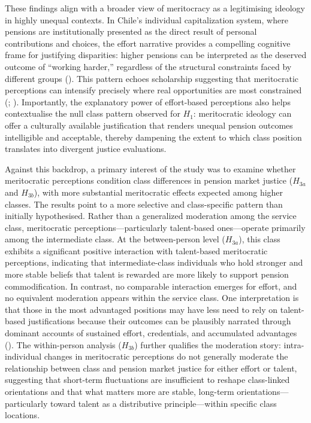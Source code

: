 \documentclass[
  12pt,
]{article}
\begin{document}
These findings align with a broader view of meritocracy as a
legitimising ideology in highly unequal contexts. In Chile's individual
capitalization system, where pensions are institutionally presented as
the direct result of personal contributions and choices, the effort
narrative provides a compelling cognitive frame for justifying
disparities: higher pensions can be interpreted as the deserved outcome
of ``working harder,'' regardless of the structural constraints faced by
different groups (). This pattern echoes scholarship suggesting that
meritocratic perceptions can intensify precisely where real
opportunities are most constrained
(;
). Importantly, the
explanatory power of effort-based perceptions also helps contextualise
the null class pattern observed for \(H_1\): meritocratic ideology can
offer a culturally available justification that renders unequal pension
outcomes intelligible and acceptable, thereby dampening the extent to
which class position translates into divergent justice evaluations.

Against this backdrop, a primary interest of the study was to examine
whether meritocratic perceptions condition class differences in pension
market justice (\(H_{3a}\) and \(H_{3b}\)), with more substantial
meritocratic effects expected among higher classes. The results point to
a more selective and class-specific pattern than initially hypothesised.
Rather than a generalized moderation among the service class,
meritocratic perceptions---particularly talent-based ones---operate
primarily among the intermediate class. At the between-person level
(\(H_{3a}\)), this class exhibits a significant positive interaction
with talent-based meritocratic perceptions, indicating that
intermediate-class individuals who hold stronger and more stable beliefs
that talent is rewarded are more likely to support pension
commodification. In contrast, no comparable interaction emerges for
effort, and no equivalent moderation appears within the service class.
One interpretation is that those in the most advantaged positions may
have less need to rely on talent-based justifications because their
outcomes can be plausibly narrated through dominant accounts of
sustained effort, credentials, and accumulated advantages
(). The
within-person analysis (\(H_{3b}\)) further qualifies the moderation
story: intra-individual changes in meritocratic perceptions do not
generally moderate the relationship between class and pension market
justice for either effort or talent, suggesting that short-term
fluctuations are insufficient to reshape class-linked orientations and
that what matters more are stable, long-term orientations---particularly
toward talent as a distributive principle---within specific class
locations.
\end{document}
